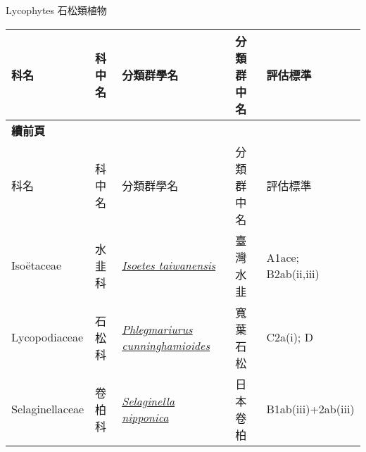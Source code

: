 \noindent\normalfont\selectfont Lycophytes 石松類植物
\footnotesize\selectfont
        {\def\arraystretch{1.5}\tabcolsep=2pt
        \begin{longtable}{p{2.5cm}p{2.5cm}p{4.5cm}p{2.5cm}p{3cm}}
        \toprule
          科名 & 科中名 & 分類群學名 & 分類群中名 & 評估標準 \\
        \midrule 
        \endfirsthead

        {{\bfseries 續前頁 }} \\
        科名 & 科中名 & 分類群學名 & 分類群中名 & 評估標準 \\
        \midrule
        \endhead
                Isoëtaceae & 水韭科 & \href{http://www.theplantlist.org/tpl1.1/search?q=Isoetes+taiwanensis}{\textit{Isoetes taiwanensis} } & 臺灣水韭 & A1ace; B2ab(ii,iii) \index{Isoetes@\textit{Isoetes}!taiwanensis@\textit{taiwanensis}}  \index{臺灣水韭} \\
    Lycopodiaceae & 石松科 & \href{http://www.theplantlist.org/tpl1.1/search?q=Phlegmariurus+cunninghamioides}{\textit{Phlegmariurus cunninghamioides} } & 寬葉石松 & C2a(i); D \index{Phlegmariurus@\textit{Phlegmariurus}!cunninghamioides@\textit{cunninghamioides}}  \index{寬葉石松} \\
    Selaginellaceae & 卷柏科 & \href{http://www.theplantlist.org/tpl1.1/search?q=Selaginella+nipponica}{\textit{Selaginella nipponica} } & 日本卷柏 & B1ab(iii)+2ab(iii) \index{Selaginella@\textit{Selaginella}!nipponica@\textit{nipponica}}  \index{日本卷柏} \\
    \bottomrule
        \end{longtable}
        }
    